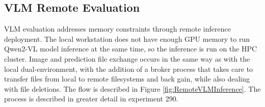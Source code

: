 

\subsection{VLM Remote Evaluation}

VLM evaluation addresses memory constraints through remote inference deployment. The local workstation does not have enough GPU memory to run Qwen2-VL model inference at the same time, so the inference is run on the HPC cluster. Image and prediction file exchange occurs in the same way as with the local dual-environment, with the addition of a broker process that takes care to transfer files from local to remote filesystems and back gain, while also dealing with file deletions. The flow is described in Figure \ref{fig:RemoteVLMInference}. The process is described in greater detail in experiment 290. 


